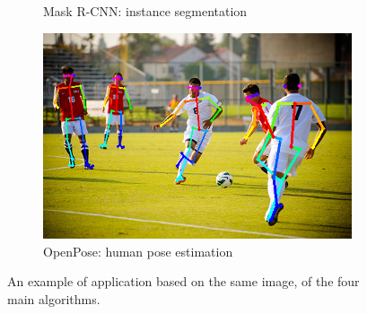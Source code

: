 \begin{figure}[!h]
\begin{subfigure}{.45\linewidth}
		\caption{Mask R-CNN: instance segmentation}
	\end{subfigure}
	\begin{subfigure}{.45\linewidth}
		\includegraphics[width=\linewidth]{images/detection/ex3_openpose}
		\caption{OpenPose: human pose estimation}
	\end{subfigure}
	\caption{An example of application based on the same image, of the four main algorithms.}
	\label{fig:ex_detectionAlgorithms}
\end{figure}






